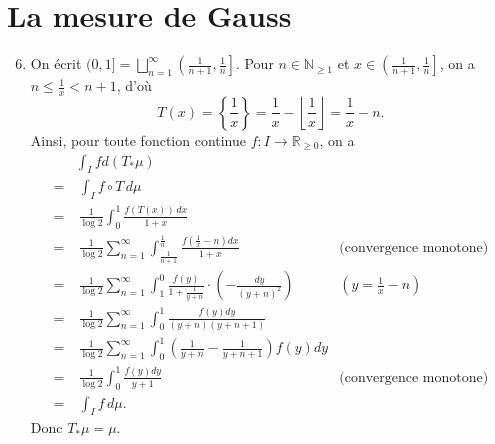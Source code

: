 \documentclass[french]{article}
\theoremstyle{definition}
\newcommand{\set}[1]{\left\{#1\right\}}
\newcommand{\tuple}[1]{\left(#1\right)}
\newcommand{\olin}[1]{\left(#1\right]}
\newcommand{\floor}[1]{\left\lfloor#1\right\rfloor}
\newcommand{\Nbb}{\mathbb{N}}
\newcommand{\Rbb}{\mathbb{R}}
\begin{document}
\section*{La mesure de Gauss}
\begin{enumerate}
    \setcounter{enumi}{5}
    \item \label{Partie6}
        On \'ecrit $(0,1] = \bigsqcup_{n = 1}^\infty \olin{\frac{1}{n+1},\frac{1}{n}}$. Pour $n \in \Nbb_{\ge 1}$ et $x \in \olin{\frac{1}{n+1},\frac{1}{n}}$, on a $n \le \frac{1}{x} < n+1$, d'o\`u 
            $$T(x) = \set{\frac{1}{x}} = \frac{1}{x} - \floor{\frac{1}{x}} = \frac{1}{x} - n.$$
        Ainsi, pour toute fonction continue $f:I \to \Rbb_{\ge 0}$, on a
            \begin{align*}
                & \int_I f d(T_\ast \mu)\\
                = & \ 
                \int_{I} f \circ T \,d\mu \\
                = & \ \frac{1}{\log 2}\int_0^1 \frac{f(T(x))\,dx}{1 + x} \\
                = & \ \frac{1}{\log 2}\sum_{n = 1}^\infty \int_{\frac{1}{n+1}}^{\frac{1}{n}} \frac{f\tuple{\frac{1}{x} - n}dx}{1 + x} & \text{(convergence monotone)}\\
                = & \ \frac{1}{\log 2}\sum_{n = 1}^\infty \int_1^0 \frac{f(y)}{1 + \frac{1}{y+n}} \cdot \tuple{-\frac{dy}{(y+n)^2}} & (y = \frac{1}{x} - n) \\
                = & \ \frac{1}{\log 2}\sum_{n = 1}^\infty \int_0^1 \frac{f(y)dy}{(y+n)(y+n+1)} \\
                = & \ \frac{1}{\log 2}\sum_{n=1}^\infty \int_0^1 \tuple{\frac{1}{y+n} - \frac{1}{y+n+1}}f(y)dy \\
                = & \ \frac{1}{\log 2}\int_0^1 \frac{f(y)dy}{y+1} & \text{(convergence monotone)}\\
                = & \ \int_I f\, d\mu.
            \end{align*}
        Donc $T_\ast \mu = \mu$.
        

\end{enumerate}
\end{document}
